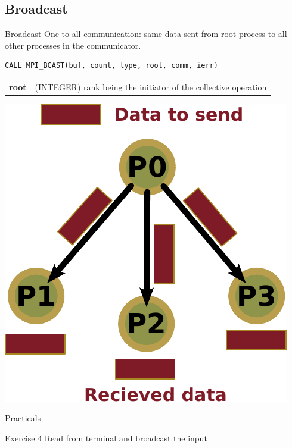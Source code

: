 \documentclass[aspectratio=43]{beamer}
\begin{document}
\subsection{Broadcast}
\begin{frame}[fragile]{Broadcast}
One-to-all communication: same data sent from root process to all other processes in the communicator.\\
\footnotesize
\begin{verbatim}
CALL MPI_BCAST(buf, count, type, root, comm, ierr)
\end{verbatim}
\begin{black1block}{}
\begin{tabular}{rp{8cm}}
\textbf{root} & (INTEGER) rank being the initiator of the collective operation\\
\end{tabular}
\end{black1block}
\begin{center}
\includegraphics[scale=0.5]{03.MPI_Coll/broadcast.pdf}
\end{center}
\end{frame}

\begin{frame}{Practicals}
    \begin{brown2block}{Exercise 4}
        Read from terminal and broadcast the input
    \end{brown2block}
\end{frame}
\end{document}
